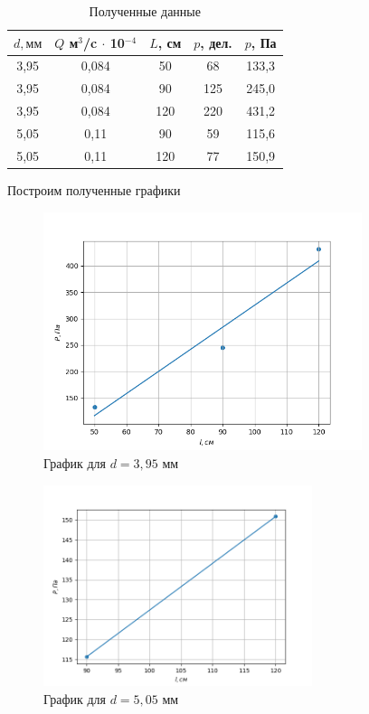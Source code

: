\documentclass[a4paper, 12pt]{article}
\begin{document}
    \begin{table}[!ht]
        \centering
        \begin{tabular}{|c|c|c|c|c|}
        \hline
            $d, мм$ & $Q$ м$^3$/c $\cdot$ 10$^{-4}$ & $L$, см & $p$, дел. & $p$, Па \\ \hline
            3,95 & 0,084 & 50 & 68 & 133,3 \\ \hline
            3,95 & 0,084 & 90 & 125 & 245,0 \\ \hline
            3,95 & 0,084 & 120 & 220 & 431,2 \\ \hline
            5,05 & 0,11 & 90 & 59 & 115,6 \\ \hline
            5,05 & 0,11 & 120 & 77 & 150,9 \\ \hline
        \end{tabular}
        \caption{Полученные данные}
    \end{table}

    Построим полученные графики 


    \begin{figure}[!ht]
        \centering
        \includegraphics[width=0.83\textwidth]{first.png}
        \caption{График для $d = 3,95$ мм}
    \end{figure}

    \begin{figure}[!ht]
        \centering
        \includegraphics[width=0.7\textwidth]{second.png}
        \caption{График для $d = 5,05$ мм}
    \end{figure}
\end{document}
